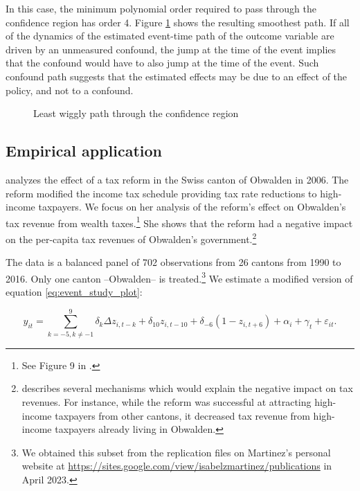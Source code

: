 \documentclass[bib]{./sty/statapress}
\begin{document}
In this case, the minimum polynomial order required to pass through the confidence region has order 4.
Figure \ref{fig:smpath} shows the resulting smoothest path.
If all of the dynamics of the estimated event-time path of the outcome variable are driven by an unmeasured confound, the jump at the time of the event implies that the confound would have to also jump at the time of the event.
Such confound path suggests that the estimated effects may be due to an effect of the policy, and not to a confound.

\begin{figure}[h!]
\begin{center}
\end{center}
\caption{Least wiggly path through the confidence region}
\label{fig:smpath}
\end{figure}


\subsection{Empirical application}\label{sec:app}

\citet{martinez2022mobility} analyzes the effect of a tax reform in the Swiss canton of Obwalden in 2006.
The reform modified the income tax schedule providing tax rate reductions to high-income taxpayers.
We focus on her analysis of the reform's effect on Obwalden's tax revenue from wealth taxes.\footnote{See Figure 9 in \citet{martinez2022mobility}.}
She shows that the reform had a negative impact on the per-capita tax revenues of Obwalden's government.\footnote {\citet{martinez2022mobility} describes several mechanisms which would explain the negative impact on tax revenues.
For instance, while the reform was successful at attracting high-income taxpayers from other cantons, it decreased tax revenue from high-income taxpayers already living in Obwalden.}

The data is a balanced panel of 702 observations from 26 cantons from 1990 to 2016.
Only one canton --Obwalden-- is treated.\footnote{We obtained this subset from the replication files on Martinez's personal website at \href{https://sites.google.com/view/isabelzmartinez/publications}{https://sites.google.com/view/isabelzmartinez/publications} in April 2023.}
We estimate a modified version of equation \eqref{eq:event_study_plot}:

\begin{equation}\label{eq:martinez}
y_{it} = \sum_{k=-5,k\neq -1}^{9}\delta_k \Delta z_{i,t-k} + \delta_{10} z_{i,t-10} + \delta_{-6}(1-z_{i,t+6}) + \alpha_{i} + \gamma_{t} + \varepsilon_{it}.
\end{equation}
\end{document}
